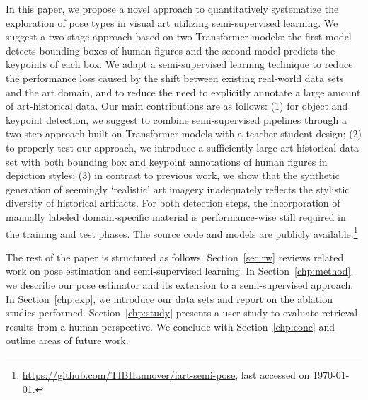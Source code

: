 \documentclass[sigconf]{acmart}
\begin{document}
In this paper, we propose a novel approach to quantitatively systematize the exploration of pose types in visual art utilizing semi-supervised learning. We suggest a two-stage approach based on two Transformer models: the first model detects bounding boxes of human figures and the second model predicts the keypoints of each box. 
We adapt a semi-supervised learning technique to reduce the performance loss caused by the shift between existing real-world data sets and the art domain, and to reduce the need to explicitly annotate a large amount of art-historical data. 
Our main contributions are as follows: 
(1) for object and keypoint detection, we suggest to combine semi-supervised pipelines through a two-step approach built on Transformer models with a teacher-student design; 
(2) to properly test our approach, we introduce a sufficiently large art-historical data set with both bounding box and keypoint annotations of human figures in  depiction styles; 
(3) in contrast to previous work, we show that the synthetic generation of seemingly \enquote*{realistic} art imagery inadequately reflects the stylistic diversity of historical artifacts. 
For both detection steps, the incorporation of manually labeled domain-specific material is performance-wise still required in the training and test phases.
The source code and models are publicly available.\footnote{\url{https://github.com/TIBHannover/iart-semi-pose}, last accessed on \today.}

The rest of the paper is structured as follows. Section~\ref{sec:rw} reviews related work on pose estimation and semi-supervised learning. In Section~\ref{chp:method}, we describe our pose estimator and its extension to a semi-supervised approach. 
In Section~\ref{chp:exp}, we introduce our data sets and report on the ablation studies performed.
Section~\ref{chp:study} presents a user study to evaluate retrieval results from a human perspective. We conclude with Section~\ref{chp:conc} and outline areas of future work.
\end{document}
